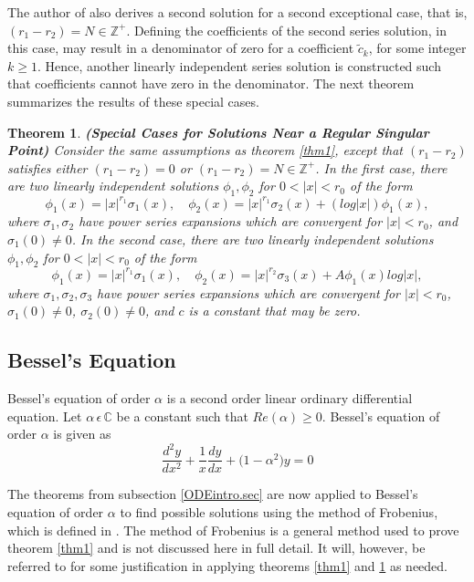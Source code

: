 \documentclass[12pt]{article}
\newtheorem{theorem}{Theorem}[section]
\theoremstyle{definition}
\numberwithin{equation}{section}
\begin{document}
{The author of \cite{Codd} also derives a second solution for a second exceptional case, that is, $(r_1-r_2)=N\in\mathbb{Z}^{+}$. Defining the coefficients of the second series solution, in this case, may result in a denominator of zero for a coefficient $\tilde{c}_k$, for some integer $k\geq 1$. Hence, another linearly independent series solution is constructed such that coefficients cannot have zero in the denominator. The next theorem summarizes the results of these special cases.
\begin{theorem}\label{thm2}\textbf{(Special Cases for Solutions Near a Regular Singular Point)}
Consider the same assumptions as theorem \ref{thm1}, except that $(r_1-r_2)$ satisfies either $(r_1-r_2)=0$ or $(r_1-r_2)=N\in\mathbb{Z}^{+}$. In the first case, there are two linearly independent solutions $\phi_1,\phi_2$ for $0<\vert{x}\vert<r_0$ of the form
$$\phi_1(x)=\vert{x}\vert^{r_1}\sigma_1(x),\quad\phi_2(x)=\vert{x}\vert^{r_1}\sigma_2(x)+(log|x|)\phi_1(x),$$
where $\sigma_1,\sigma_2$ have power series expansions which are convergent for $|x|<r_0$, and $\sigma_1(0)\neq 0$. In the second case, there are two linearly independent solutions $\phi_1,\phi_2$ for $0<|x|<r_0$ of the form
$$\phi_1(x)=|x|^{r_1}\sigma_1(x),\quad \phi_2(x)=|x|^{r_2}\sigma_3(x)+A\phi_1(x)log|x|,$$
where $\sigma_1,\sigma_2,\sigma_3$ have power series expansions which are convergent for $|x|<r_0$, $\sigma_1(0)\neq 0$, $\sigma_2(0)\neq 0$, and $c$ is a constant that may be zero.
\end{theorem}
\subsection{Bessel's Equation}\label{bessel.sec}
Bessel's equation of order $\alpha$ is a second order linear ordinary differential equation. Let $\alpha\,\epsilon\,\mathbb{C}$ be a constant such that $Re(\alpha)\geq 0$. Bessel's equation of order $\alpha$ is given as
\begin{equation}
\frac{d^2y}{dx^2}+\frac{1}{x}\frac{dy}{dx}+\bigg(1-\alpha^2\bigg)y=0
\label{b1.eqn}
\end{equation}

The theorems from subsection \ref{ODEintro.sec} are now applied to Bessel's equation of order $\alpha$ to find possible solutions using the method of Frobenius, which is defined in \cite{Codd}. The method of Frobenius is a general method used to prove theorem \ref{thm1} and is not discussed here in full detail. It will, however, be referred to for some justification in applying theorems \ref{thm1} and \ref{thm2} as needed. 

}
\end{document}
